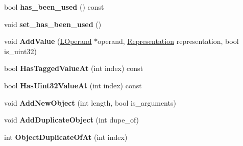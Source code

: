 \begin{DoxyCompactItemize}
\item 
bool {\bfseries has\+\_\+been\+\_\+used} () const \hypertarget{classv8_1_1internal_1_1_l_environment_adc4480de4dbfafb8646d79c0474b545f}{}\label{classv8_1_1internal_1_1_l_environment_adc4480de4dbfafb8646d79c0474b545f}

\item 
void {\bfseries set\+\_\+has\+\_\+been\+\_\+used} ()\hypertarget{classv8_1_1internal_1_1_l_environment_a85e08cc4d00d881cbb20b2348a877bd1}{}\label{classv8_1_1internal_1_1_l_environment_a85e08cc4d00d881cbb20b2348a877bd1}

\item 
void {\bfseries Add\+Value} (\hyperlink{classv8_1_1internal_1_1_l_operand}{L\+Operand} $\ast$operand, \hyperlink{classv8_1_1internal_1_1_representation}{Representation} representation, bool is\+\_\+uint32)\hypertarget{classv8_1_1internal_1_1_l_environment_afc1d688f29769f8562fe6db9d934e0fb}{}\label{classv8_1_1internal_1_1_l_environment_afc1d688f29769f8562fe6db9d934e0fb}

\item 
bool {\bfseries Has\+Tagged\+Value\+At} (int index) const \hypertarget{classv8_1_1internal_1_1_l_environment_a26a80fbf305adc60b6630303ae891b58}{}\label{classv8_1_1internal_1_1_l_environment_a26a80fbf305adc60b6630303ae891b58}

\item 
bool {\bfseries Has\+Uint32\+Value\+At} (int index) const \hypertarget{classv8_1_1internal_1_1_l_environment_a89513a20224f75f918a8aff189d94fde}{}\label{classv8_1_1internal_1_1_l_environment_a89513a20224f75f918a8aff189d94fde}

\item 
void {\bfseries Add\+New\+Object} (int length, bool is\+\_\+arguments)\hypertarget{classv8_1_1internal_1_1_l_environment_a5c5aec3af7e47a05e083f676f0cbe632}{}\label{classv8_1_1internal_1_1_l_environment_a5c5aec3af7e47a05e083f676f0cbe632}

\item 
void {\bfseries Add\+Duplicate\+Object} (int dupe\+\_\+of)\hypertarget{classv8_1_1internal_1_1_l_environment_aaab40ffe7b51a4bd17b85ec1c757bf72}{}\label{classv8_1_1internal_1_1_l_environment_aaab40ffe7b51a4bd17b85ec1c757bf72}

\item 
int {\bfseries Object\+Duplicate\+Of\+At} (int index)\hypertarget{classv8_1_1internal_1_1_l_environment_a3caf7afa75e66e9d87e22a85535b086e}{}\label{classv8_1_1internal_1_1_l_environment_a3caf7afa75e66e9d87e22a85535b086e}


\end{DoxyCompactItemize}
